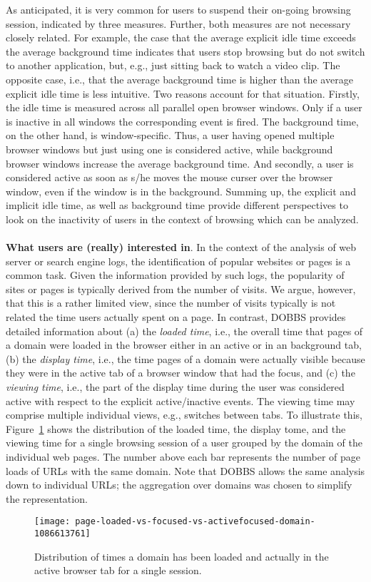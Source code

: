 \documentclass[11pt,fleqn,twoside]{article}
\begin{document}
As anticipated, it is very common for users to suspend their on-going browsing session, indicated by three measures. Further, both measures are not necessary closely related. For example, the case that the average explicit idle time exceeds the average background time indicates that users stop browsing but do not switch to another application, but, e.g., just sitting back to watch a video clip. The opposite case, i.e., that the average background time is higher than the average explicit idle time is less intuitive. Two reasons account for that situation. Firstly, the idle time is measured across all parallel open browser windows. Only if a user is inactive in all windows the corresponding event is fired. The background time, on the other hand, is window-specific. Thus, a user having opened multiple browser windows but just using one is considered active, while background browser windows increase the average background time. And secondly, a user is considered active as soon as s/he moves the mouse curser over 
the browser window, even if the window is in the background. Summing up, the explicit and implicit idle time, as well as background time provide different perspectives to look on the inactivity of users in the context of browsing which can be analyzed.
\\
\\
\textbf{What users are (really) interested in}. 
In the context of the analysis of web server or search engine logs, the identification of popular websites or pages is a common task. Given the information provided by such logs, the popularity of sites or pages is typically derived from the number of visits. We argue, however, that this is a rather limited view, since the number of visits typically is not related the time users actually spent on a page. In contrast, DOBBS provides detailed information about (a) the \textit{loaded time}, i.e., the overall time that pages of a domain were loaded in the browser either in an active or in an background tab, (b) the \textit{display time}, i.e., the time pages of a domain were actually visible because they were in the active tab of a browser window that had the focus, and (c) the \textit{viewing time}, i.e., the part of the display time during the user was considered active with respect to the explicit active/inactive events. The viewing time may comprise multiple individual views, e.g., switches between tabs. To 
illustrate this, Figure~\ref{fig:page-loaded-vs-focus} shows the distribution of the loaded time, the display tome, and the viewing time for a single browsing session of a user grouped by the domain of the individual web pages. The number above each bar represents the number of page loads of URLs with the same domain. Note that DOBBS allows the same analysis down to individual URLs; the aggregation over domains was chosen to simplify the representation.
\begin{figure} 
 \centering
 \texttt{[image: page-loaded-vs-focused-vs-activefocused-domain-1086613761]}
 \caption{Distribution of times a domain has been loaded and actually in the active browser tab for a single session.}
 \label{fig:page-loaded-vs-focus}
\end{figure}
\end{document}
